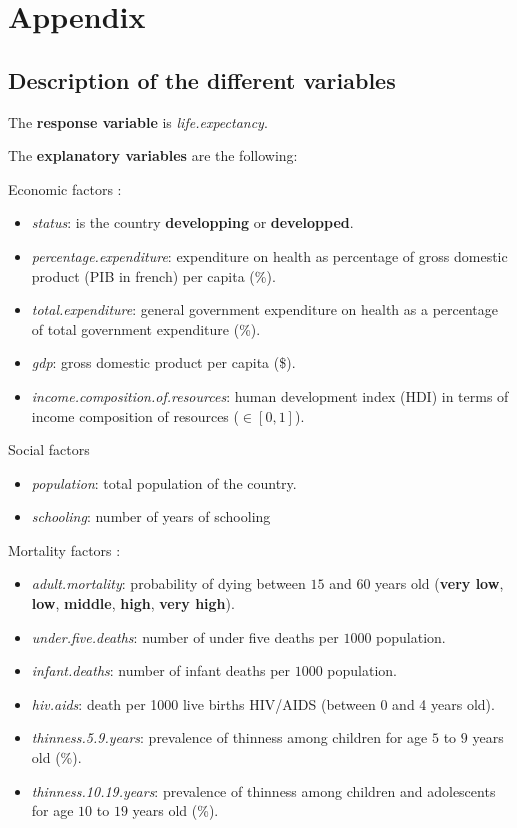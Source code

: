 \section*{Appendix}

\subsection*{Description of the different variables}

The \textbf{response variable} is \textit{life.expectancy}.

The \textbf{explanatory variables} are the following:

Economic factors :
\begin{itemize}
	\item \textit{status}: is the country \textbf{developping} or \textbf{developped}.
	\item \textit{percentage.expenditure}: expenditure on health as percentage of gross domestic product (PIB in french) per capita (\%).
	\item \textit{total.expenditure}: general government expenditure on health as a percentage of total government expenditure (\%).
	\item \textit{gdp}: gross domestic product per capita (\$).
	\item \textit{income.composition.of.resources}: human development index (HDI) in terms of income composition of resources ($\in [0,1]$).
\end{itemize}

Social factors
\begin{itemize}
	\item \textit{population}: total population of the country.
	\item \textit{schooling}: number of years of schooling
\end{itemize}

Mortality factors : 
\begin{itemize}
	\item \textit{adult.mortality}: probability of dying between $15$ and $60$ years old (\textbf{very low}, \textbf{low}, \textbf{middle}, \textbf{high}, \textbf{very high}).
	\item \textit{under.five.deaths}: number of under five deaths per $1000$ population.
	\item \textit{infant.deaths}: number of infant deaths per $1000$ population.
	\item \textit{hiv.aids}: death per 1000 live births HIV/AIDS (between 0 and 4 years old).
	\item \textit{thinness.5.9.years}: prevalence of thinness among children for age $5$ to $9$ years old (\%).
	\item \textit{thinness.10.19.years}: prevalence of thinness among children and adolescents for age $10$ to $19$ years old (\%).
\end{itemize}

